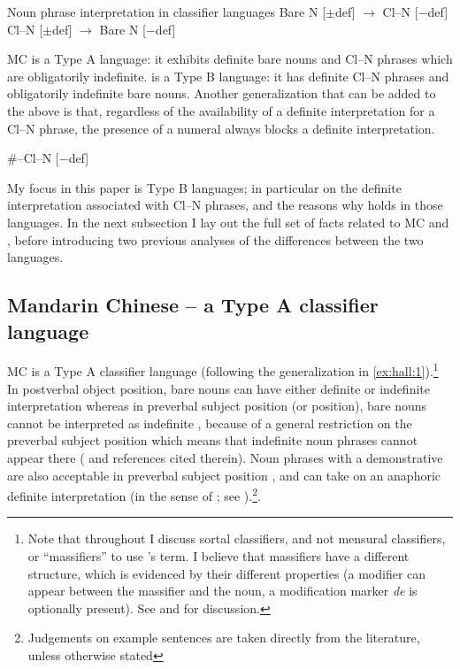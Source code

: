\documentclass[output=paper
,modfonts
,nonflat]{langsci/langscibook}
\begin{document}
\ea \label{ex:hall:1}
Noun phrase interpretation in classifier languages
\ea Bare N [$\pm$def] $\rightarrow$ Cl--N [$-$def] 
\ex Cl--N [$\pm$def] $\rightarrow$ Bare N [$-$def] 
\z
\z

MC is a Type A language: it exhibits definite bare nouns and Cl--N phrases which are obligatorily indefinite.  is a Type B language: it has definite Cl--N phrases and obligatorily indefinite bare nouns.
Another generalization that can be added to the above is that, regardless of the availability of a definite interpretation for a Cl--N phrase, the presence of a numeral always blocks a definite interpretation.

\ea \label{ex:hall:2}
\#--Cl--N [$-$def]  
\z

My focus in this paper is Type B languages; in particular on the definite interpretation associated with Cl--N phrases, and the reasons why  holds in those languages. In the next subsection I lay out the full set of facts related to MC and , before introducing two previous analyses of the differences between the two languages.

\subsection{Mandarin Chinese -- a Type A classifier language} 

MC is a Type A classifier language (following the generalization in \ref{ex:hall:1}).\footnote{Note that throughout I discuss sortal classifiers, and not mensural classifiers, or ``massifiers'' to use \citet{ChengSybesma1998}'s term. I believe that massifiers have a different structure, which is evidenced by their different properties (a modifier can appear between the massifier and the noun, a modification marker \textit{de} is optionally present). See \citet{ChengSybesma1998} and \citet{ChengSybesma1999} for discussion.} In postverbal object position, bare nouns can have either definite or indefinite interpretation whereas in preverbal subject position (or  position), bare nouns cannot be interpreted as indefinite , because of a general restriction on the preverbal subject position which means that indefinite noun phrases cannot appear there (\citealt[288]{HuangEtAlii2009} and references cited therein). Noun phrases with a demonstrative are also acceptable in preverbal subject position , and can take on an anaphoric definite interpretation (in the sense of \citealt{Schwarz2009}; see \citealt{Jenks2015}).\footnote{Judgements on example sentences are taken directly from the literature, unless otherwise stated}.
\end{document}
